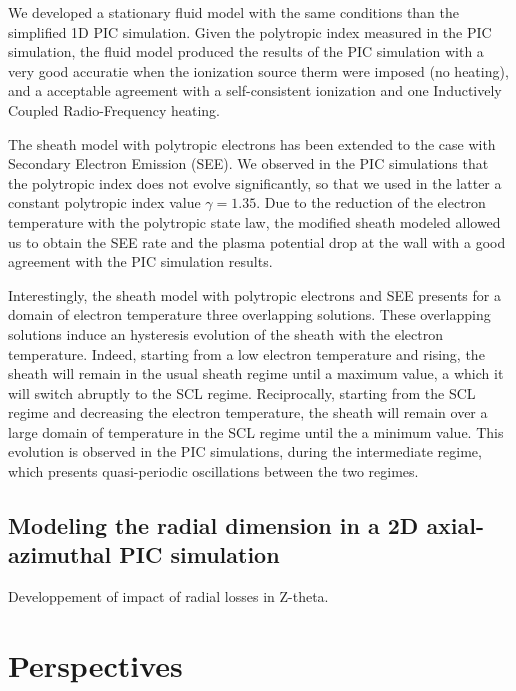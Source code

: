 We developed a stationary fluid model with the same conditions than the simplified 1D PIC simulation.
Given the polytropic index measured in the PIC simulation, the fluid model produced the results of the PIC simulation with a very good accuratie when the ionization source therm were imposed (no heating), and a acceptable agreement with a self-consistent ionization and one Inductively Coupled Radio-Frequency heating.

\vspace{1ex}
The sheath model with polytropic electrons has been extended to the case with Secondary Electron Emission (SEE).
We observed in the PIC simulations that the polytropic index does not evolve significantly, so that we used in the latter a constant polytropic index value $\gamma=1.35$.
Due to the reduction of the electron temperature with the polytropic state law, the modified sheath modeled allowed us to obtain the SEE rate and the plasma potential drop at the wall with a good agreement with the PIC simulation results.

Interestingly, the sheath model with polytropic electrons and SEE presents for a domain of electron temperature three overlapping solutions.
These overlapping solutions induce an hysteresis evolution of the sheath with the electron temperature.
Indeed, starting from a low electron temperature and rising, the sheath will remain in the usual sheath regime until a maximum value, a which it will switch abruptly to the SCL regime.
Reciprocally, starting from the SCL regime and decreasing the electron temperature, the sheath will remain over a large domain of temperature in the SCL regime until the a minimum value.
This evolution is observed in the PIC simulations, during the intermediate regime, which presents quasi-periodic oscillations between the two regimes. 


\subsection{Modeling the radial dimension in a 2D axial-azimuthal PIC simulation}

Developpement of impact of radial losses in Z-theta.




\section{Perspectives}

